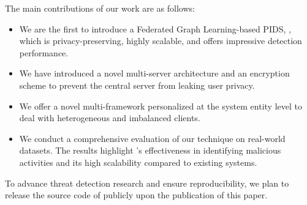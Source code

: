
The main contributions of our work are as follows:

\begin{itemize}[topsep=.1ex,itemsep=-.1ex,leftmargin=*]
    \item We are the first to introduce a Federated Graph Learning-based PIDS, \Sys, which is privacy-preserving, highly scalable, and offers impressive detection performance.
    \item We have introduced a novel multi-server architecture and an encryption scheme to prevent the central server from leaking user privacy.
    \item We offer a novel multi-\gnnshort framework personalized at the system entity level to deal with heterogeneous and imbalanced clients.
    \item We conduct a comprehensive evaluation of our technique on real-world datasets. The results highlight \Sys's effectiveness in identifying malicious activities and its high scalability compared to existing systems.
\end{itemize}

 To advance threat detection research and ensure reproducibility, we plan to release the source code of \Sys publicly upon the publication of this paper.